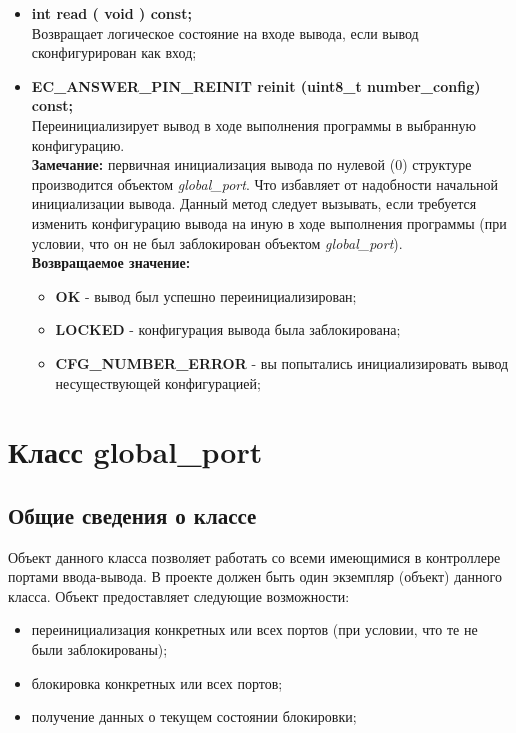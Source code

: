 \begin{itemize}
	\item \textbf{int		read	( void ) const;}\\Возвращает логическое состояние на входе вывода, если вывод сконфигурирован как вход;
	\item \textbf{EC\_ANSWER\_PIN\_REINIT	reinit	(uint8\_t number\_config) const;}\\Переинициализирует вывод в ходе выполнения программы в выбранную конфигурацию.\\\textbf{Замечание: }первичная инициализация вывода по нулевой (0) структуре производится объектом \textit{global\_port}. Что избавляет от надобности начальной инициализации вывода. Данный метод следует вызывать, если требуется изменить конфигурацию вывода на иную в ходе выполнения программы (при условии, что он не был заблокирован объектом \textit{global\_port}).\\\textbf{Возвращаемое значение:}
	\begin{itemize}
		\item \textbf{OK} - вывод был успешно переинициализирован;
		\item \textbf{LOCKED} - конфигурация вывода была заблокирована;
		\item \textbf{CFG\_NUMBER\_ERROR} - вы попытались инициализировать вывод несуществующей конфигурацией;
	\end{itemize}
\end{itemize}

\section{Класс global\_port}\label{class:global:port}
\subsection{Общие сведения о классе}
Объект данного класса позволяет работать со всеми имеющимися в контроллере портами ввода-вывода. В проекте должен быть один экземпляр (объект) данного класса. Объект предоставляет следующие возможности:
\begin{itemize}
	\item переинициализация конкретных или всех портов (при условии, что те не были заблокированы);
	\item блокировка конкретных или всех портов;
	\item получение данных о текущем состоянии блокировки;
\end{itemize}

